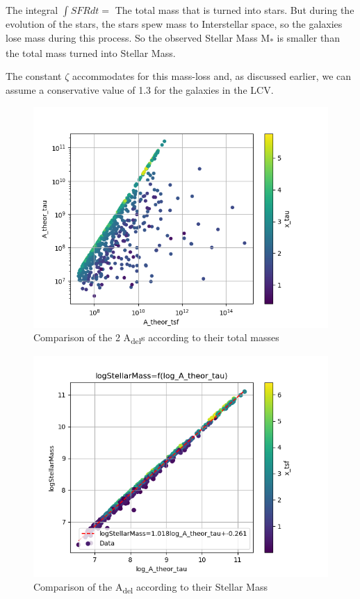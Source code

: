 \documentclass[a4paper,twocolumn]{article}
\begin{document}
The integral \(\int SFR dt=\) The total mass that is turned into stars. But during the evolution of the stars, the stars spew mass to Interstellar space, so the galaxies lose mass during this process. So the observed Stellar Mass M\textsubscript{*} is smaller than the total mass turned into Stellar Mass.

The constant \(\zeta\) accommodates for this mass-loss and, as discussed earlier, we can assume a conservative value of 1.3 for the galaxies in the LCV.

\begin{figure}[!htpb]
\centering
\includegraphics[width=.9\linewidth]{./figs/A_theor_tau-M*.png}
\caption{\label{fig:Comparison of the 2 A_{del}s according to their total masses}Comparison of the 2 A\textsubscript{del}s according to their total masses}
\end{figure}

\begin{figure}[!htpb]
\centering
\includegraphics[width=.9\linewidth]{./figs/log_A_theor_tau-logStellarMass-color_x_tsf.png}
\caption{\label{fig:Comparison of the A_del according to their Stellar Mass}Comparison of the A\textsubscript{del} according to their Stellar Mass}
\end{figure}
\end{document}
